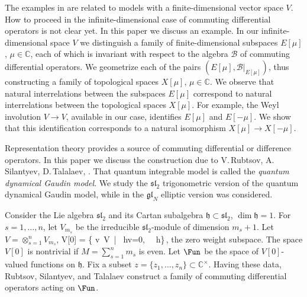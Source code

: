 \documentclass[12pt]{amsart}
\let\frak\mathfrak
\numberwithin{equation}{section}
\theoremstyle{definition}
\let\mc\mathcal
\def\C{{\mathbb C}}
\def\B{{\mc B}}
\def\gln{\mathfrak{gl}_N}
\def\h{{\mathfrak h}}
\def\slt{{\frak{sl}_2}}
\begin{document}
The examples in \cite{MTV3, MTV5} are related to models with  a finite-dimensional vector space $V$.
How to proceed in the infinite-dimensional case of commuting differential operators
 is not clear yet. In this paper we discuss an example. 
 In our infinite-dimensional space $V$
 we distinguish a family of finite-dimensional subspaces $E[\mu]$, $\mu\in\C$, each of which is invariant
 with respect to the algebra $\B$ of commuting differential operators. We geometrize each of the pairs
 $(E[\mu], \B\big\vert_{E[\mu]})$, thus constructing a family of topological spaces $X[\mu]$, $\mu\in\C$. 
 We observe that natural interrelations between the subspaces $E[\mu]$ correspond to natural interrelations
 between the topological spaces $X[\mu]$. For example,  the Weyl involution
$V\to V$, available in our case, identifies $E[\mu]$ and 
 $E[-\mu]$. We show that this identification corresponds to a natural
 isomorphism $X[\mu]\to X[-\mu]$.
 
 
 


\smallskip


Representation theory provides a source of commuting differential or difference operators. In this
paper we discuss the  construction due to 
  V.\,Rubtsov, A.\,Silantyev, D.\,Talalaev, \cite{RST}. That quantum integrable model
   is called the {\it quantum dynamical Gaudin model}. We study the $\slt$ trigonometric version
   of the quantum dynamical Gaudin model, while in \cite{RST}  the $\gln$ elliptic version
was considered. 
\smallskip

Consider the Lie algebra $\slt$ and its Cartan subalgebra $\h\subset \slt$,
$\dim \h = 1$.
For $s=1,\dots,n$, let    $V_{m_s}$ be the irreducible  $\slt$-module of dimension $m_s+1$.
Let  $V=\otimes_{s=1}^nV_{m_s}$,
\bea
V[0] = \{ v\in\ V\ | \ hv=0, \  \ \forall h\in\h\}\,,
\eea
the zero weight subspace.  The space $V[0]$ is nontrivial if $M=\sum_{s=1}^nm_s$ is even.
Let 
$\Fun$  be the
  space of $V[0]$-valued functions on $\h$.
Fix a subset $z=\{z_1,\dots,z_n\}\subset \C^\times$. 
Having these data,  Rubtsov, Silantyev, and Talalaev  construct a family of commuting differential operators acting on $\Fun$. 
\end{document}
